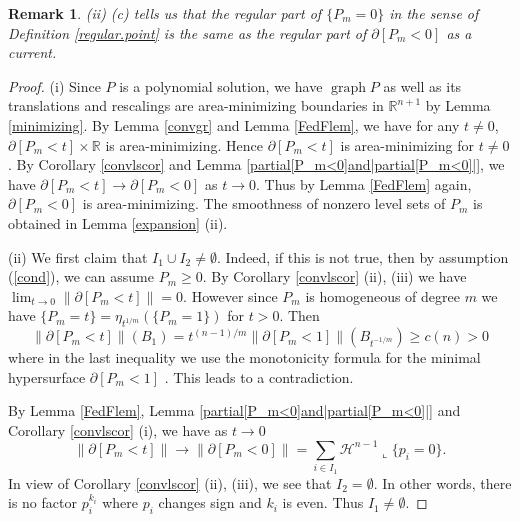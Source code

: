 \documentclass[pdflatex,sn-mathphys-num]{sn-jnl}%
\theoremstyle{thmstyleone}%
\theoremstyle{thmstyletwo}%
\newtheorem{remark}{Remark}%
\theoremstyle{thmstylethree}%
\newcommand{\HH}{\mathcal{H}}
\newcommand{\R}{\mathbb{R}}
\DeclareMathOperator{\graph}{graph}
\begin{document}
\begin{remark}
	(ii) (c) tells us that the regular part of $\{P_m=0\}$ in the sense of Definition \ref{regular.point} is the same as the regular part of $\partial [P_m<0]$ as a current.
\end{remark}
\begin{proof}
	(i) Since $P$ is a polynomial solution, we have $\graph P$ as well as its translations and rescalings are area-minimizing boundaries in $\R^{n+1}$ by Lemma \ref{minimizing}. By Lemma \ref{convgr} and Lemma \ref{FedFlem}, we have for any $t\neq 0$, $\partial [ P_m<t]\times\R$ is area-minimizing. Hence $\partial [ P_m<t]$ is area-minimizing for $t\neq0$. By Corollary \ref{convlscor} and Lemma \ref{partial[P_m<0]and|partial[P_m<0]|}, we have $\partial [ P_m<t]\to \partial [ P_m<0]$ as $t\to0$. Thus by Lemma \ref{FedFlem} again, $\partial [ P_m<0]$ is area-minimizing. The smoothness of nonzero level sets of $P_m$ is obtained in Lemma \ref{expansion} (ii).
	
	(ii)  We first claim that $I_1\cup I_2\neq\emptyset$. Indeed, if this is not true, then by assumption (\ref{cond}), we can assume $P_m\ge0$. By Corollary \ref{convlscor} (ii), (iii) we have $\lim_{t\to0}\|\partial [ P_m<t]\|=0$. However since $P_m$ is homogeneous of degree $m$ we have $\{P_m=t\}=\eta_{t^{1/m}}(\{P_m=1\})$ for $t>0$. Then \[\|\partial [ P_m<t]\|(B_1)=t^{(n-1)/m}\|\partial [ P_m<1]\|(B_{t^{-1/m}})\ge c(n)>0\] where in the last inequality we use the monotonicity formula for the minimal hypersurface $\partial [P_m<1]$ \cite[Theorem 17.6]{Sim}. This leads to a contradiction. 
	
	By Lemma \ref{FedFlem}, Lemma \ref{partial[P_m<0]and|partial[P_m<0]|}  and Corollary \ref{convlscor} (i), we have as $t\to0$ \[\|\partial [ P_m<t]\|\to \|\partial [ P_m<0]\|=\sum_{i\in I_1}\HH^{n-1}\llcorner{\{p_i=0\}}.\] In view of Corollary \ref{convlscor} (ii), (iii), we see that $I_2=\emptyset$. In other words, there is no factor $p_i^{k_i}$ where $p_i$ changes sign and $k_i$ is even. Thus $I_1\neq\emptyset$.
	

\end{proof}
\end{document}

